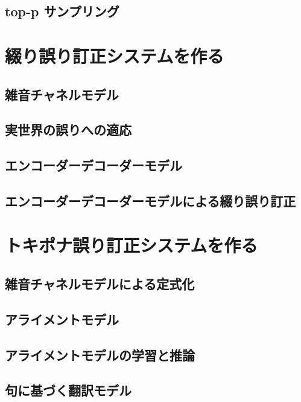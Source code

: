 \documentclass[11pt]{report}
\begin{document}
\section{top-p サンプリング}

\chapter{綴り誤り訂正システムを作る}

\section{雑音チャネルモデル}

\section{実世界の誤りへの適応}

\section{エンコーダーデコーダーモデル}

\section{エンコーダーデコーダーモデルによる綴り誤り訂正}

\chapter{トキポナ誤り訂正システムを作る}

\section{雑音チャネルモデルによる定式化}

\section{アライメントモデル}

\section{アライメントモデルの学習と推論}

\section{句に基づく翻訳モデル}
\end{document}
